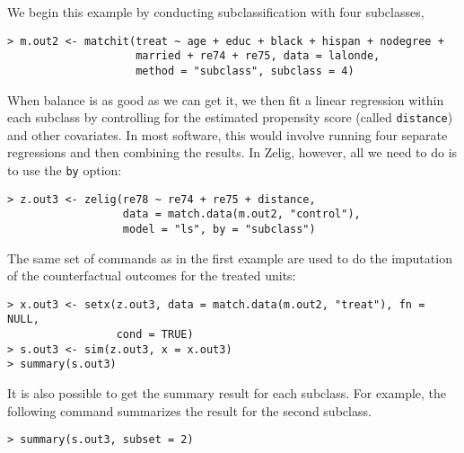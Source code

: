\begin{enumerate}
  We begin this example by conducting subclassification with four
  subclasses,
\begin{verbatim}
> m.out2 <- matchit(treat ~ age + educ + black + hispan + nodegree + 
                    married + re74 + re75, data = lalonde, 
                    method = "subclass", subclass = 4)
\end{verbatim}
  When balance is as good as we can get it, we then fit a linear
  regression within each subclass by controlling for the estimated
  propensity score (called \texttt{distance}) and other covariates.
  In most software, this would involve running four separate
  regressions and then combining the results.  In Zelig, however, all
  we need to do is to use the {\tt by} option:
\begin{verbatim}
> z.out3 <- zelig(re78 ~ re74 + re75 + distance, 
                  data = match.data(m.out2, "control"), 
                  model = "ls", by = "subclass")
\end{verbatim}
  The same set of commands as in the first example are used to do the
  imputation of the counterfactual outcomes for the treated units:
\begin{verbatim}
> x.out3 <- setx(z.out3, data = match.data(m.out2, "treat"), fn = NULL, 
                 cond = TRUE)
> s.out3 <- sim(z.out3, x = x.out3)
> summary(s.out3)
\end{verbatim}
It is also possible to get the summary result for each subclass. For
example, the following command summarizes the result for the second
subclass.
\begin{verbatim}
> summary(s.out3, subset = 2)
\end{verbatim}
  
\end{enumerate}


